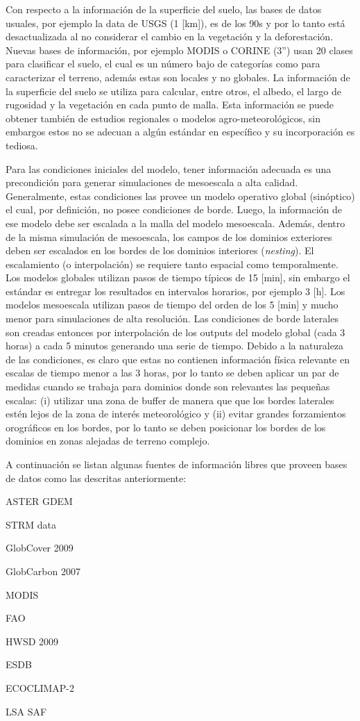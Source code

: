 Con respecto a la información de la superficie del suelo, las bases de datos usuales, por ejemplo la data de USGS (1 [km]), es de los 90s y por lo tanto está desactualizada al no considerar el cambio en la vegetación y la deforestación. Nuevas bases de información, por ejemplo MODIS o CORINE (3'') usan 20 clases para clasificar el suelo, el cual es un número bajo de categorías como para caracterizar el terreno, además estas son locales y no globales. La información de la superficie del suelo se utiliza para calcular, entre otros, el albedo, el largo de rugosidad y la vegetación en cada punto de malla. Esta información se puede obtener también de estudios regionales o modelos agro-meteorológicos, sin embargos estos no se adecuan a algún estándar en específico y su incorporación es tediosa.
 
Para las condiciones iniciales del modelo, tener información adecuada es una precondición para generar simulaciones de mesoescala a alta calidad. Generalmente, estas condiciones las provee un modelo operativo global (sinóptico) el cual, por definición, no posee condiciones de borde. Luego, la información de ese modelo debe ser escalada a la malla del modelo mesoescala. Además, dentro de la misma simulación de mesoescala, los campos de los dominios exteriores deben ser escalados en los bordes de los dominios interiores (\emph{nesting}). El escalamiento (o interpolación) se requiere tanto espacial como temporalmente. Los modelos globales utilizan pasos de tiempo típicos de 15 [min], sin embargo el estándar es entregar los resultados en intervalos horarios, por ejemplo 3 [h]. Los modelos mesoescala utilizan pasos de tiempo del orden de los 5 [min] y mucho menor para simulaciones de alta resolución. Las condiciones de borde laterales son creadas entonces por interpolación de los outputs del modelo global (cada 3 horas) a cada 5 minutos generando una serie de tiempo. Debido a la naturaleza de las condiciones, es claro que estas no contienen información física relevante en escalas de tiempo menor a las 3 horas, por lo tanto se deben aplicar un par de medidas cuando se trabaja para dominios donde son relevantes las pequeñas escalas: (i) utilizar una zona de buffer de manera que que los bordes laterales estén lejos de la zona de interés meteorológico y (ii) evitar grandes forzamientos orográficos en los bordes, por lo tanto se deben posicionar los bordes de los dominios en zonas alejadas de terreno complejo. 

A continuación  se listan algunas fuentes de información libres que proveen bases de datos como las descritas anteriormente:
\begin{itemize*}
	\item ASTER GDEM
	\item STRM data
	\item GlobCover 2009
	\item GlobCarbon 2007
	\item MODIS
	\item FAO
	\item HWSD 2009
	\item ESDB
	\item ECOCLIMAP-2
	\item LSA SAF
\end{itemize*}
\newpage
